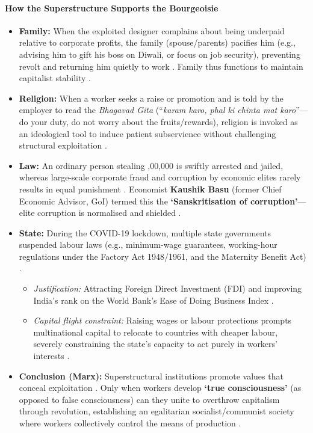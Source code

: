 \paragraph{How the Superstructure Supports the Bourgeoisie}
\begin{itemize}
    \item \textbf{Family:} When the exploited designer complains about being underpaid relative to corporate profits, the family (spouse/parents) pacifies him (e.g., advising him to gift his boss on Diwali, or focus on job security), preventing revolt and returning him quietly to work . Family thus functions to maintain capitalist stability .
    \item \textbf{Religion:} When a worker seeks a raise or promotion and is told by the employer to read the \textit{Bhagavad Gita} (``\textit{karam karo, phal ki chinta mat karo}''---do your duty, do not worry about the fruits/rewards), religion is invoked as an ideological tool to induce patient subservience without challenging structural exploitation .
    \item \textbf{Law:} An ordinary person stealing ,00,000 is swiftly arrested and jailed, whereas large-scale corporate fraud and corruption by economic elites rarely results in equal punishment . Economist \textbf{Kaushik Basu} (former Chief Economic Advisor, GoI) termed this the \textbf{`Sanskritisation of corruption'}---elite corruption is normalised and shielded .
    \item \textbf{State:} During the COVID-19 lockdown, multiple state governments suspended labour laws (e.g., minimum-wage guarantees, working-hour regulations under the Factory Act 1948/1961, and the Maternity Benefit Act) .
    \begin{itemize}
        \item \textit{Justification:} Attracting Foreign Direct Investment (FDI) and improving India's rank on the World Bank's Ease of Doing Business Index .
        \item \textit{Capital flight constraint:} Raising wages or labour protections prompts multinational capital to relocate to countries with cheaper labour, severely constraining the state's capacity to act purely in workers' interests .
    \end{itemize}
    \item \textbf{Conclusion (Marx):} Superstructural institutions promote values that conceal exploitation . Only when workers develop \textbf{`true consciousness'} (as opposed to false consciousness) can they unite to overthrow capitalism through revolution, establishing an egalitarian socialist/communist society where workers collectively control the means of production .
\end{itemize}

